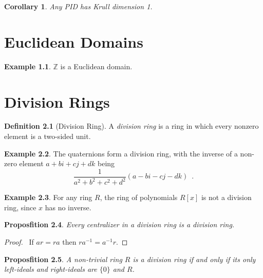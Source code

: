 \documentclass{book}
\let\qed\relax
\newtheorem{prop}{Proposfition}[chapter]
\newtheorem{cor}{Corollary}[prop]
\theoremstyle{definition}
\newtheorem{df}[prop]{Definition}
\newtheorem{ex}[prop]{Example}
\newcommand{\inv}[1]{\ensuremath{{#1}^{-1}}}
\begin{document}
\begin{cor}
Any PID has Krull dimension 1.
\end{cor}

\chapter{Euclidean Domains}


\begin{ex}
$\mathbb{Z}$ is a Euclidean domain.
\end{ex}

\chapter{Division Rings}

\begin{df}[Division Ring]
A \emph{division ring} is a ring in which every nonzero element is a two-sided unit.
\end{df}

\begin{ex}
The quaternions form a division ring, with the inverse of a non-zero element $a + bi + cj + dk$ being
\[ \frac{1}{a^2 + b^2 + c^2 + d^2} (a - bi - cj - dk) \enspace . \]
\end{ex}

\begin{ex}
For any ring $R$, the ring of polynomials $R[x]$ is not a division ring, since $x$ has no inverse.
\end{ex}

\begin{prop}
Every centralizer in a division ring is a division ring.
\end{prop}

\begin{proof}
\pf\ If $ar = ra$ then $r\inv{a} = \inv{a}r$. \qed
\end{proof}

\begin{prop}
\label{prop:division-ring-ideals}
A non-trivial ring $R$ is a division ring if and only if its only left-ideals and right-ideals are $\{0\}$ and $R$.
\end{prop}
\end{document}
